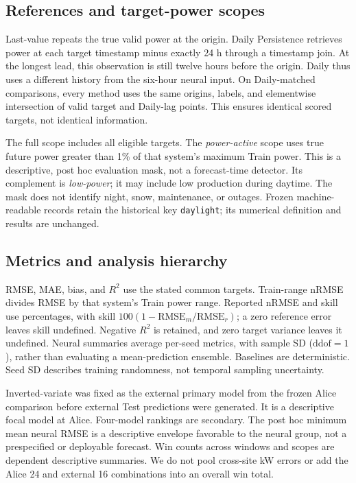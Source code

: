 \documentclass[aip,reprint,floatfix,amsmath,amssymb]{revtex4-2}
\begin{document}
\subsection{References and target-power scopes}
Last-value repeats the true valid power at the origin. Daily Persistence retrieves power at each target timestamp minus exactly 24 h through a timestamp join. At the longest lead, this observation is still twelve hours before the origin. Daily thus uses a different history from the six-hour neural input. On Daily-matched comparisons, every method uses the same origins, labels, and elementwise intersection of valid target and Daily-lag points. This ensures identical scored targets, not identical information.

The full scope includes all eligible targets. The \emph{power-active} scope uses true future power greater than 1\% of that system's maximum Train power. This is a descriptive, post hoc evaluation mask, not a forecast-time detector. Its complement is \emph{low-power}; it may include low production during daytime. The mask does not identify night, snow, maintenance, or outages. Frozen machine-readable records retain the historical key \texttt{daylight}; its numerical definition and results are unchanged.

\subsection{Metrics and analysis hierarchy}
RMSE, MAE, bias, and $R^2$ use the stated common targets. Train-range nRMSE divides RMSE by that system's Train power range. Reported nRMSE and skill use percentages, with skill $100(1-\mathrm{RMSE}_{m}/\mathrm{RMSE}_{r})$; a zero reference error leaves skill undefined. Negative $R^2$ is retained, and zero target variance leaves it undefined. Neural summaries average per-seed metrics, with sample SD ($\mathrm{ddof}=1$), rather than evaluating a mean-prediction ensemble. Baselines are deterministic. Seed SD describes training randomness, not temporal sampling uncertainty.

Inverted-variate was fixed as the external primary model from the frozen Alice comparison before external Test predictions were generated. It is a descriptive focal model at Alice. Four-model rankings are secondary. The post hoc minimum mean neural RMSE is a descriptive envelope favorable to the neural group, not a prespecified or deployable forecast. Win counts across windows and scopes are dependent descriptive summaries. We do not pool cross-site kW errors or add the Alice 24 and external 16 combinations into an overall win total.
\end{document}
